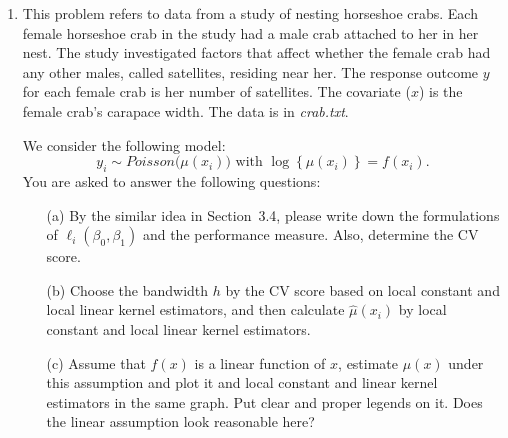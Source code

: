 \documentclass[11pt]{article}
\begin{document}
\begin{enumerate}
\begin{enumerate}
\end{enumerate}
\item This problem refers to data from a study of nesting horseshoe crabs. 
Each female horseshoe crab in the study had a male crab attached to her in her nest. The study investigated factors that affect whether the female crab had any other males, called satellites, residing near her. 
The response outcome $y$ for each female crab is her number of satellites. 
The covariate ($x$) is  the female crab's carapace width. The data is in {\it crab.txt}. 

We consider the following model: 
$$
y_i\sim Poisson\Big(\mu(x_{i}) \Big)
\mbox{ with } 
\log\left\{\mu(x_{i}) \right\}
=f(x_i).
$$
You are asked to answer the following questions:
\begin{itemize}
\item[(a)] By the similar idea in Section~3.4, please write down the formulations of $\ell_i(\beta_0,\beta_1)$ and the performance measure. Also, determine the CV score.

\item[(b)] Choose the bandwidth $h$ by the CV score based on local constant and local linear kernel estimators, and then calculate $\widehat{\mu}(x_i)$ by local constant and local linear kernel estimators.

\item[(c)] Assume that $f(x)$ is a linear function of $x$, estimate $\mu(x)$ under this assumption and plot it and local constant and linear kernel estimators in the same graph.  Put clear and proper legends on it. Does the linear assumption look reasonable here?
\end{itemize}

\end{enumerate}
\end{document}
